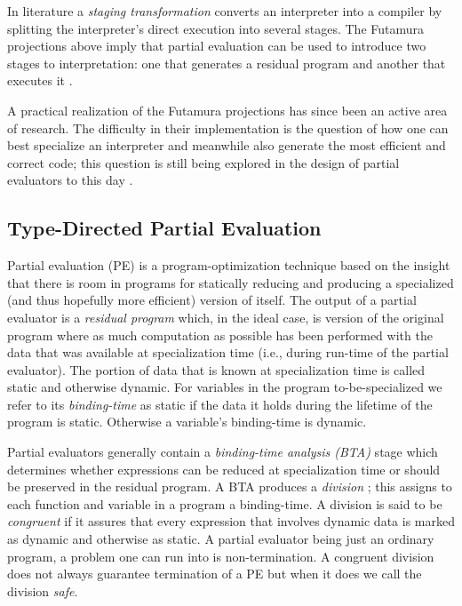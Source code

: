 \documentclass[a4paper,12pt,twoside,openright]{report}
\theoremstyle{definition}
\begin{document}
In literature a \textit{staging transformation} \cite{jorring1986compilers,brady2006verified}  converts an interpreter into a compiler by splitting the interpreter's direct execution into several stages. The Futamura projections above imply that partial evaluation can be used to introduce two stages to interpretation: one that generates a residual program and another that executes it \cite{jones1993partial}.

A practical realization of the Futamura projections has since been an active area of research. The difficulty in their implementation is the question of how one can best specialize an interpreter and meanwhile also generate the most efficient and correct code; this question is still being explored in the design of partial evaluators to this day \cite{jones1988challenging,jones1993partial}.

\subsection{Type-Directed Partial Evaluation}\label{subsec:tdpe}
Partial evaluation (PE) is a program-optimization technique based on the insight that there is room in programs for statically reducing and producing a specialized (and thus hopefully more efficient) version of itself. The output of a partial evaluator is a \textit{residual program} which, in the ideal case, is version of the original program where as much computation as possible has been performed with the data that was available at specialization time (i.e., during run-time of the partial evaluator). The portion of data that is known at specialization time is called static and otherwise dynamic. For variables in the program to-be-specialized we refer to its \textit{binding-time} as static if the data it holds during the lifetime of the program is static. Otherwise a variable's binding-time is dynamic.

Partial evaluators generally contain a \textit{binding-time analysis (BTA)} stage which determines whether expressions can be reduced at specialization time or should be preserved in the residual program. A BTA produces a \textit{division} \cite{jones1993partial}; this assigns to each function and variable in a program a binding-time. A division is said to be \textit{congruent} if it assures that every expression that involves dynamic data is marked as dynamic and otherwise as static. A partial evaluator being just an ordinary program, a problem one can run into is non-termination. A congruent division does not always guarantee termination of a PE but when it does we call the division \textit{safe}.
\end{document}

